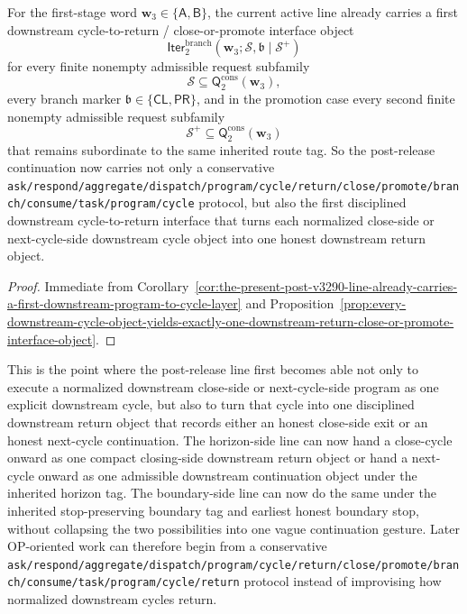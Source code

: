 \begin{corollary}
\label{cor:the-present-post-v3290-line-already-carries-a-first-downstream-cycle-to-return-interface}
For the first-stage word \(\mathbf w_3\in\{\mathsf A,\mathsf B\}\), the current active line already carries a first downstream cycle-to-return / close-or-promote interface object
\[
 \mathsf{Iter}^{\mathrm{branch}}_{2}(\mathbf w_3;\mathcal S,\mathfrak b\mid\mathcal S^{+})
\]
for every finite nonempty admissible request subfamily
\[
 \mathcal S\subseteq \mathsf{Q}^{\mathrm{cons}}_{2}(\mathbf w_3),
\]
every branch marker \(\mathfrak b\in\{\mathsf{CL},\mathsf{PR}\}\), and in the promotion case every second finite nonempty admissible request subfamily
\[
 \mathcal S^{+}\subseteq \mathsf{Q}^{\mathrm{cons}}_{2}(\mathbf w_3)
\]
that remains subordinate to the same inherited route tag. So the post-release continuation now carries not only a conservative {\nolinkurl{ask/respond/aggregate/dispatch/program/cycle/return/close/promote/branch/consume/task/program/cycle}} protocol, but also the first disciplined downstream cycle-to-return interface that turns each normalized close-side or next-cycle-side downstream cycle object into one honest downstream return object.
\end{corollary}

\begin{proof}
Immediate from Corollary~\ref{cor:the-present-post-v3290-line-already-carries-a-first-downstream-program-to-cycle-layer} and Proposition~\ref{prop:every-downstream-cycle-object-yields-exactly-one-downstream-return-close-or-promote-interface-object}.
\end{proof}

\begin{remark}
\label{rem:what-the-first-downstream-cycle-to-return-interface-now-buys}
This is the point where the post-release line first becomes able not only to execute a normalized downstream close-side or next-cycle-side program as one explicit downstream cycle, but also to turn that cycle into one disciplined downstream return object that records either an honest close-side exit or an honest next-cycle continuation. The horizon-side line can now hand a close-cycle onward as one compact closing-side downstream return object or hand a next-cycle onward as one admissible downstream continuation object under the inherited horizon tag. The boundary-side line can now do the same under the inherited stop-preserving boundary tag and earliest honest boundary stop, without collapsing the two possibilities into one vague continuation gesture. Later OP-oriented work can therefore begin from a conservative {\nolinkurl{ask/respond/aggregate/dispatch/program/cycle/return/close/promote/branch/consume/task/program/cycle/return}} protocol instead of improvising how normalized downstream cycles return.
\end{remark}


